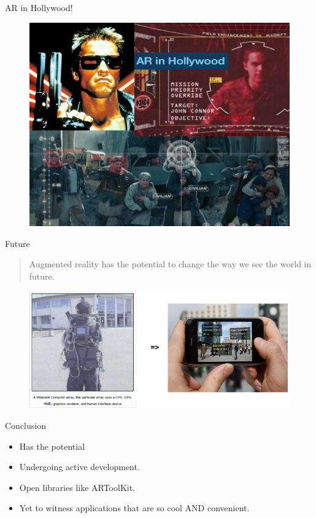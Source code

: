 \documentclass{beamer}
\begin{document}
\begin{frame}{AR in Hollywood!}
	\begin{figure}
		\includegraphics[scale=.45]{movie.png}
	\end{figure}
\end{frame}


\begin{frame}{Future}
	\begin{quote}
		Augmented reality has the potential to change the way we see the world in future.
	\end{quote}
	\begin{figure}
		\pause \includegraphics[scale=.45]{conclusion.png}\\
	\end{figure}
\end{frame}


\begin{frame}{Conclusion}
	\begin{itemize}
		\item Has the potential
		\item Undergoing active development.
		\item Open libraries like ARToolKit.
		\item Yet to witness applications that are so cool AND convenient. 
 	\end{itemize}
\end{frame}
\end{document}
